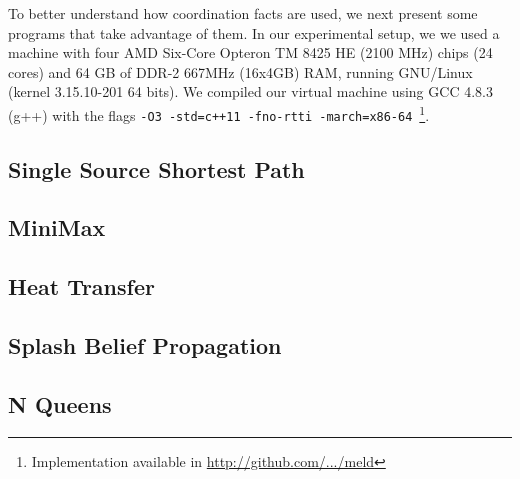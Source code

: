 
To better understand how coordination facts are used, we next present some programs that
take advantage of them. In our experimental setup, we we used a machine with
four AMD Six-Core Opteron TM 8425 HE (2100 MHz) chips (24 cores) and 64 GB of
DDR-2 667MHz (16x4GB) RAM, running GNU/Linux (kernel 3.15.10-201 64 bits).
We compiled our virtual machine using GCC 4.8.3 (g++) with the flags
\texttt{-O3 -std=c++11 -fno-rtti -march=x86-64}~\footnote{Implementation
   available in \url{http://github.com/.../meld}}.

\subsection{Single Source Shortest Path}


\subsection{MiniMax}



\subsection{Heat Transfer}



\subsection{Splash Belief Propagation}



\subsection{N Queens}
